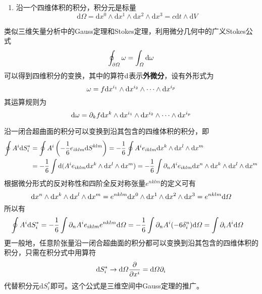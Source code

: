 \begin{enumerate}
\item 沿一个四维体积的积分，积分元是标量
\begin{equation}
	\mathrm{d}\varOmega = \mathrm{d}x^0 \wedge \mathrm{d}x^1 \wedge \mathrm{d}x^2 \wedge \mathrm{d}x^3 = c\mathrm{d}t \wedge \mathrm{d}V
\end{equation}
\end{enumerate}

类似三维矢量分析中的Gauss定理和Stokes定理，利用微分几何中的广义Stokes公式
\begin{equation}
	\oint_{\partial \varOmega} \omega = \int_\varOmega \mathrm{d} \omega
	\label{chapter1:广义Stokes公式}
\end{equation}
可以得到四维积分的变换，其中的算符$\mathrm{d}$表示{\bf 外微分}，设有外形式为
\begin{equation*}
	\omega = f\mathrm{d} x^{i_1} \wedge \mathrm{d} x^{i_2} \wedge \cdots \wedge \mathrm{d} x^{i_p}
\end{equation*}
其运算规则为
\begin{equation*}
	\mathrm{d} \omega = \partial_k f \mathrm{d} x^k \wedge \mathrm{d} x^{i_1} \wedge \mathrm{d} x^{i_2} \wedge \cdots \wedge \mathrm{d} x^{i_p}
\end{equation*}

沿一闭合超曲面的积分可以变换到沿其包含的四维体积的积分，即
\begin{align*}
	\oint A^i \mathrm{d} S^*_i & = \oint A^i\left(-\frac16 e_{iklm} \mathrm{d} S^{klm}\right) = -\frac16 \oint A^ie_{iklm} \mathrm{d} x^k \wedge \mathrm{d} x^l \wedge \mathrm{d} x^m \\
	& = -\frac16 \int \mathrm{d} (A^ie_{iklm} \mathrm{d} x^k \wedge \mathrm{d} x^l \wedge \mathrm{d} x^m) = -\frac16 \int \partial_n A^ie_{iklm} \mathrm{d} x^n \wedge \mathrm{d} x^k \wedge \mathrm{d} x^l \wedge \mathrm{d} x^m
\end{align*}
根据微分形式的反对称性和四阶全反对称张量$e^{nklm}$的定义可有
\begin{equation*}
	\mathrm{d} x^n \wedge \mathrm{d} x^k \wedge \mathrm{d} x^l \wedge \mathrm{d} x^m = e^{nklm} \mathrm{d} x^0\wedge \mathrm{d} x^1\wedge \mathrm{d} x^2\wedge \mathrm{d} x^3 = e^{nklm} \mathrm{d} \varOmega
\end{equation*}
所以有
\begin{align*}
	\oint A^i \mathrm{d} S^*_i & = -\frac16 \int \partial_n A^ie_{iklm}e^{nklm} \mathrm{d} \varOmega = -\frac16 \int\partial_n A^i (-6\delta^n_i) \mathrm{d} \varOmega = \int \partial_iA^i \mathrm{d} \varOmega
\end{align*}
更一般地，任意阶张量沿一闭合超曲面的积分都可以变换到沿其包含的四维体积的积分，只需在积分式中用算符
\begin{equation}
	\mathrm{d}S^*_i \to \mathrm{d}\varOmega \frac{\partial}{\partial x^i} = \mathrm{d}\varOmega \partial_i
\end{equation}
代替积分元$\mathrm{d}S^*_i$即可。这个公式是三维空间中Gauss定理的推广。

